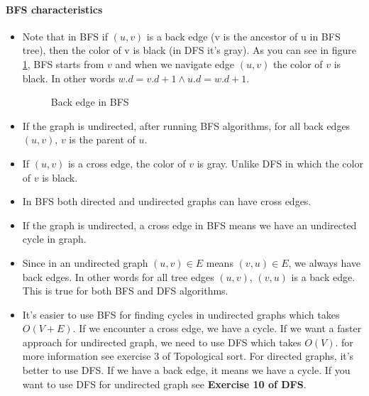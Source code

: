 \documentclass{book}
\begin{document}
	\paragraph{BFS characteristics}
	\begin{itemize}
		\item Note that in BFS if $(u, v)$ is a back edge (v is the ancestor of u in BFS tree), then the color of v is black (in DFS it's gray). As you can see in figure \ref{fig:BackEdgeInBfs}, BFS starts from $v$ and when we navigate edge $(u, v)$ the color of $v$ is black. In other words $w.d = v.d + 1 \land u.d = w.d + 1$.
		
		\begin{figure}[h!]
			\centering
			\caption{Back edge in BFS}
			\label{fig:BackEdgeInBfs}
		\end{figure}
		\FloatBarrier

		\item If the graph is undirected, after running BFS algorithms, for all back edges $(u, v)$, $v$ is the parent of $u$.				
		\item If $(u, v)$ is a cross edge, the color of $v$ is gray. Unlike DFS in which the color of $v$ is black.
		
		\item In BFS both directed and undirected graphs can have cross edges.
		
		\item If the graph is undirected, a cross edge in BFS means we have an undirected cycle in graph.
		
		\item Since in an undirected graph $(u, v) \in E$ means $(v, u) \in E$, we always have back edges. In other words for all tree edges $(u, v)$, $(v, u)$ is a back edge. This is true for both BFS and DFS algorithms.
		
		\item It's easier to use BFS for finding cycles in undirected graphs which takes $O(V + E)$. If we encounter a cross edge, we have a cycle. If we want a faster approach for undirected graph, we need to use DFS which takes $O(V)$. for more information see exercise 3 of Topological sort. For directed graphs, it's better to use DFS. If we have a back edge, it means we have a cycle. If you want to use DFS for undirected graph see \textbf{Exercise 10 of DFS}.
	 
	\end{itemize}
		
\end{document}
